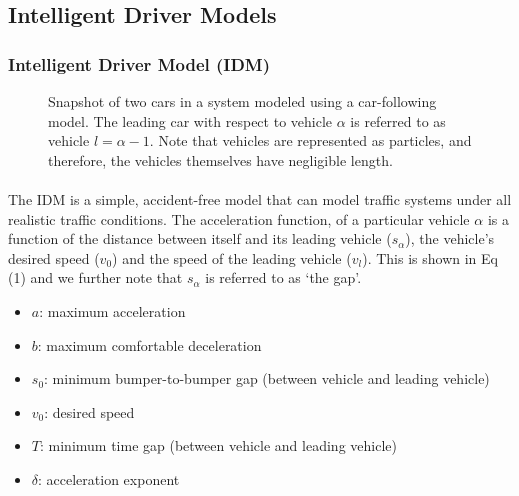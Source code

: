 \documentclass[12pt]{article}
\begin{document}
\subsection{Intelligent Driver Models}
\subsubsection{Intelligent Driver Model (IDM)}
\begin{figure}
  \centering
  \caption{Snapshot of two cars in a system modeled using a car-following model.  The leading car with respect to vehicle $\alpha$ is referred to as vehicle $l=\alpha-1$.  Note that vehicles are represented as particles, and therefore, the vehicles themselves have negligible length.}
\end{figure}
\paragraph{}
The IDM is a simple, accident-free model that can model traffic systems under all realistic traffic conditions. The acceleration function, of a particular vehicle $\alpha$ is a function of the distance between itself and its leading vehicle ($s_\alpha$), the vehicle's desired speed ($v_0$) and the speed of the leading vehicle ($v_l$). This is shown in Eq (1) and we further note that $s_\alpha$ is referred to as `the gap'. \cite[chapter~11]{treiber_kesting_2013}

\begin{mymathbox}[title=IDM Parameters, colframe=blue!30!black]
  \begin{itemize}
    \item $a$: maximum acceleration
    \item $b$: maximum comfortable deceleration
    \item $s_0$: minimum bumper-to-bumper gap (between vehicle and leading vehicle)
    \item $v_0$: desired speed
    \item $T$: minimum time gap (between vehicle and leading vehicle)
    \item $\delta$: acceleration exponent
  \end{itemize}
\end{mymathbox}
\end{document}
